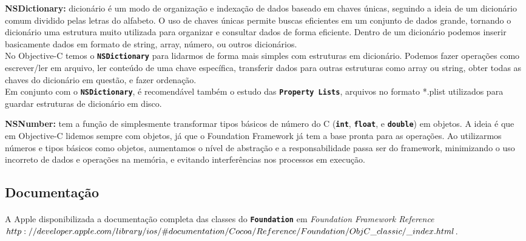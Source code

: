 \documentclass[a4paper,12pt,brazil,doubleside]{book}
\begin{document}
\begin{singlespace}
\begin{description}
\item{\textbf{NSDictionary:} dicionário é um modo de organização e indexação de dados baseado em chaves únicas, seguindo a ideia de um dicionário comum dividido pelas letras do alfabeto. O uso de chaves únicas permite buscas eficientes em um conjunto de dados grande, tornando o dicionário uma estrutura muito utilizada para organizar e consultar dados de forma eficiente. Dentro de um dicionário podemos inserir basicamente dados em formato de string, array, número, ou outros dicionários.\\
No Objective-C temos o \texttt{\textbf{NSDictionary}} para lidarmos de forma mais simples com estruturas em dicionário. Podemos fazer operações como escrever/ler em arquivo, ler conteúdo de uma chave específica, transferir dados para outras estruturas como array ou string, obter todas as chaves do dicionário em questão, e fazer ordenação.\\
Em conjunto com o \texttt{\textbf{NSDictionary}}, é recomendável também o estudo das \texttt{\textbf{Property Lists}}, arquivos no formato *.plist utilizados para guardar estruturas de dicionário em disco.}

\item{\textbf{NSNumber:} tem a função de simplesmente transformar tipos básicos de número do C (\texttt{\textbf{int}}, \texttt{\textbf{float}}, e \texttt{\textbf{double}}) em objetos. A ideia é que em Objective-C lidemos sempre com objetos, já que o Foundation Framework já tem a base pronta para as operações. Ao utilizarmos números e tipos básicos como objetos, aumentamos o nível de abstração e a responsabilidade passa ser do framework, minimizando o uso incorreto de dados e operações na memória, e evitando interferências nos processos em execução.}
\end{description}

\bigskip

\subsection{Documentação}

\paragraph{}A Apple disponibilizada a documentação completa das classes do \texttt{\textbf{Foundation}} em
\emph{Foundation Framework Reference\\ \(http://developer.apple.com/library/ios/\#documentation/Cocoa/Reference/\\Foundation/ObjC\_classic/\_index.html\)}.

\end{singlespace}
\end{document}
